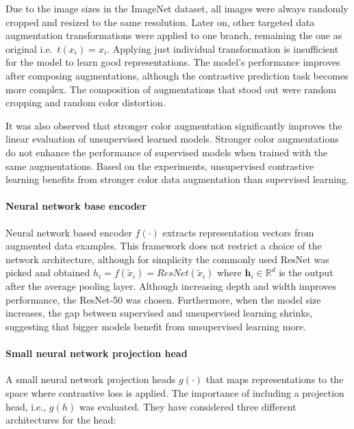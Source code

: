 \documentclass[
]{krantz}
\begin{document}
Due to the image sizes in the ImageNet dataset, all images were always randomly cropped and resized to the same resolution. Later on, other targeted data augmentation transformations were applied to one branch, remaining the one as original i.e.~\(t\left( x_{i}\right)= x_i\).
Applying just individual transformation is insufficient for the model to learn good representations. The model's performance improves after composing augmentations, although the contrastive prediction task becomes more complex. The composition of augmentations that stood out were random cropping and random color distortion.

It was also observed that stronger color augmentation significantly improves the linear evaluation of unsupervised learned models. Stronger color augmentations do not enhance the performance of supervised models when trained with the same augmentations. Based on the experiments, unsupervised contrastive learning benefits from stronger color data augmentation than supervised learning.

\hypertarget{neural-network-base-encoder}{%
\paragraph{Neural network base encoder}\label{neural-network-base-encoder}}

Neural network based encoder \(f\left( \cdot \right)\) extracts representation vectors from augmented data examples. This framework does not restrict a choice of the network architecture, although for simplicity the commonly used ResNet was picked and obtained \(h_i=f\left( \tilde{x}_{i} \right)=ResNet\left(\tilde{x}_{i}\right)\) where \(\textbf{h}_i\in \mathbb{R}^{d}\) is the output after the average pooling layer. Although increasing depth and width improves performance, the ResNet-50 was chosen. Furthermore, when the model size increases, the gap between supervised and unsupervised learning shrinks, suggesting that bigger models benefit from unsupervised learning more.

\hypertarget{small-neural-network-projection-head}{%
\paragraph{Small neural network projection head}\label{small-neural-network-projection-head}}

A small neural network projection heads \(g\left( \cdot \right)\) that maps representations to the space where contrastive loss is applied. The importance of including a projection head, i.e., \(g\left( h \right)\) was evaluated. They have considered three different architectures for the head:
\end{document}
